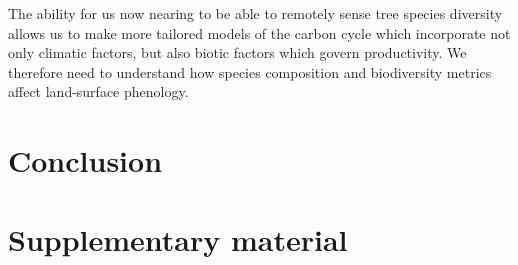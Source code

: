 \documentclass[11pt,a4paper]{article}
\begin{document}
The ability for us now nearing to be able to remotely sense tree species diversity allows us to make more tailored models of the carbon cycle which incorporate not only climatic factors, but also biotic factors which govern productivity. We therefore need to understand how species composition and biodiversity metrics affect land-surface phenology. 

\section{Conclusion}

\printbibliography

\section{Supplementary material}







\end{document}
